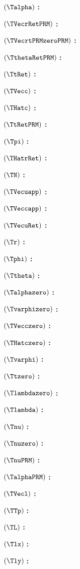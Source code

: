 $( \Talpha )$ \textbf{:} \Talphadef

$( \TVecrRetPRM )$ \textbf{:} \TVecrRetPRMdef

$( \TVecrtPRMzeroPRM )$ \textbf{:} \TVecrtPRMzeroPRMdef

$( \TthetaRetPRM )$ \textbf{:} \TthetaRetPRMdef

$( \TtRet )$ \textbf{:} \TtRetdef

$( \TVecc )$ \textbf{:} \TVeccdef

$( \THatc )$ \textbf{:} \THatcdef

$( \TtRetPRM )$ \textbf{:} \TtRetPRMdef

$( \Tpi )$ \textbf{:} \Tpidef

$( \THatrRet )$ \textbf{:} \THatrRetdef

$( \TN )$ \textbf{:} \TNdef

$( \TVecuapp )$ \textbf{:} \TVecuappdef

$( \TVeccapp )$ \textbf{:} \TVeccappdef

$( \TVecuRet )$ \textbf{:} \TVecuRetdef

$( \Tr )$ \textbf{:} \Trdef

$( \Tphi )$ \textbf{:} \Tphidef

$( \Ttheta )$ \textbf{:} \Tthetadef

$( \Talphazero )$ \textbf{:} \Talphazerodef

$( \Tvarphizero )$ \textbf{:} \Tvarphizerodef

$( \TVecczero )$ \textbf{:} \TVecczerodef

$( \THatczero )$ \textbf{:} \THatczerodef

$( \Tvarphi )$ \textbf{:} \Tvarphidef

$( \Ttzero )$ \textbf{:} \Ttzerodef

$( \Tlambdazero )$ \textbf{:} \Tlambdazerodef

$( \Tlambda )$ \textbf{:} \Tlambdadef

$( \Tnu )$ \textbf{:} \Tnudef

$( \Tnuzero )$ \textbf{:} \Tnuzerodef

$( \TnuPRM )$ \textbf{:} \TnuPRMdef

$( \TalphaPRM )$ \textbf{:} \TalphaPRMdef

$( \TVecl )$ \textbf{:} \TVecldef

$( \TTp )$ \textbf{:} \TTpdef

$( \TL )$ \textbf{:} \TLdef

$( \Tlx )$ \textbf{:} \Tlxdef

$( \Tly )$ \textbf{:} \Tlydef

